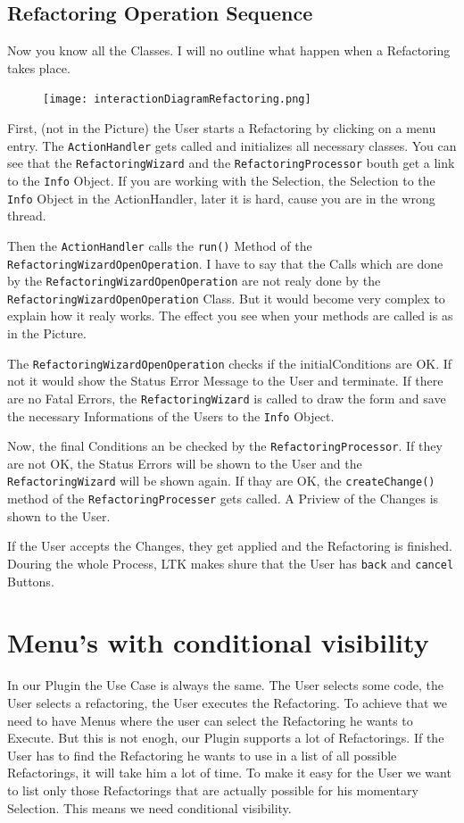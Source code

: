 \documentclass[a4paper,10pt]{report}
\begin{document}
\section{Refactoring Operation Sequence}
Now you know all the Classes. I will no outline what happen when a Refactoring takes place. 
\begin{figure}[h]
\centering
\texttt{[image: interactionDiagramRefactoring.png]}
\end{figure}
First, (not in the Picture) the User starts a Refactoring by clicking on a menu entry. The \verb!ActionHandler! gets called and initializes all necessary classes.
You can see that the \verb!RefactoringWizard! and the \verb!RefactoringProcessor! bouth get a link to the \verb!Info! Object. If you are working with the Selection, 
the Selection to the \verb!Info! Object in the ActionHandler, later it is hard, cause you are in the wrong thread.

Then the \verb!ActionHandler! calls the \verb!run()! Method of the \verb!RefactoringWizardOpenOperation!. I have to say that the Calls which are done by the
\verb!RefactoringWizardOpenOperation! are not realy done by the \verb!RefactoringWizardOpenOperation! Class. But it would become very complex to explain how it realy works.
The effect you see when your methods are called is as in the Picture.

The \verb!RefactoringWizardOpenOperation! checks if the initialConditions are OK. If not it would show the Status Error Message to the User and terminate. If there
are no Fatal Errors, the \verb!RefactoringWizard! is called to draw the form and save the necessary Informations of the Users to the \verb!Info! Object.

Now, the final Conditions an be checked by the \verb!RefactoringProcessor!. If they are not OK, the Status Errors will be shown to the User and the \verb!RefactoringWizard!
will be shown again. If thay are OK, the \verb!createChange()! method of the \verb!RefactoringProcesser! gets called. A Priview of the Changes is shown to the User.

If the User accepts the Changes, they get applied and the Refactoring is finished. Douring the whole Process, LTK makes shure that the User has \verb!back! and \verb!cancel! Buttons.

\chapter{Menu's with conditional visibility}
\label{menuWithConditionalVisibility}
In our Plugin the Use Case is always the same. The User selects some code, the User selects a refactoring, the User executes the Refactoring. To achieve that we need to have Menus where the user can select the Refactoring he wants to Execute.
But this is not enogh, our Plugin supports a lot of Refactorings. If the User has to find the Refactoring he wants to use in a list of all possible Refactorings, it will take him a lot of time.
To make it easy for the User we want to list only those Refactorings that are actually possible for his momentary Selection. This means we need conditional visibility.
\end{document}
